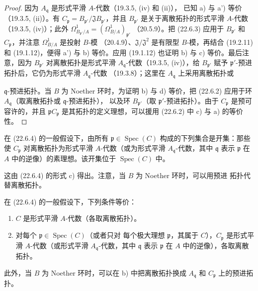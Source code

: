 \begin{proof}
因为 $A_{\mathfrak q}$ 是形式平滑 $A$-代数（19.3.5, (iv) 和 (ii)），
已知 a) 与 a') 等价（19.3.5, (ii)）。有
$C_{\mathfrak p}=B_{\mathfrak p'}/\mathfrak J B_{\mathfrak p'}$，并且
$B_{\mathfrak p'}$ 是关于离散拓扑的形式平滑 $A$-代数
（19.3.5, (iv)）；此外
$\Omega^1_{B_{\mathfrak p'}/A}=(\Omega^1_{B/A})_{\mathfrak p'}$
（20.5.9）。把 (22.6.3) 应用于 $B_{\mathfrak p'}$ 和
$C_{\mathfrak p}$，并注意 $\Omega^1_{B/A}$ 是投射 $B$-模
（20.4.9）、$\mathfrak J/\mathfrak J^2$ 是有限型 $B$-模，再结合
(19.2.11) 和 (19.1.12)，便得 a') 与 b) 等价。应用 (19.1.12) 也证明
b) 与 c) 等价。最后注意，因为 $B_{\mathfrak p'}$ 对离散拓扑是形式平滑
$A_{\mathfrak q}$-代数（19.3.5, (iv)），给 $B_{\mathfrak p'}$ 赋予
$\mathfrak p'$-预进拓扑后，它仍为形式平滑 $A_{\mathfrak q}$-代数
（19.3.8）；这里在 $A_{\mathfrak q}$ 上采用离散拓扑或


$\mathfrak q$-预进拓扑。当 $B$ 为 Noether 环时，为证明 b) 与 d) 等价，把 (22.6.2)
应用于环 $A_{\mathfrak q}$（取离散拓扑或 $\mathfrak q$-预进拓扑），
以及环 $B_{\mathfrak p'}$（取 $\mathfrak p'$-预进拓扑）。由于
$C_{\mathfrak p}$ 是预可容许的，并且
$\mathfrak pC_{\mathfrak p}$ 是其拓扑的定义理想，可以援用 (22.6.2) 中
c) 与 a) 的等价性。
\end{proof}

\begin{corollary}[22.6.5]
\label{0.22.6.5-fr}
在 (22.6.4) 的一般假设下，由所有
$\mathfrak p\in\operatorname{Spec}(C)$ 构成的下列集合是开集：那些使
$C_{\mathfrak p}$ 对离散拓扑为形式平滑 $A$-代数（或为形式平滑
$A_{\mathfrak q}$-代数，其中 $\mathfrak q$ 表示 $\mathfrak p$ 在
$A$ 中的逆像）的素理想。该开集位于 $\operatorname{Spec}(C)$ 中。
\end{corollary}

这由 (22.6.4) 的形式 c) 得出。注意，当 $B$ 为 Noether 环时，可以用预进
拓扑代替离散拓扑。

\begin{corollary}[22.6.6]
\label{0.22.6.6-fr}
在 (22.6.4) 的一般假设下，下列条件等价：
\begin{enumerate}
  \item[a)] $C$ 是形式平滑 $A$-代数（各取离散拓扑）。
  \item[b)] 对每个 $\mathfrak p\in\operatorname{Spec}(C)$（或者只对
  每个极大理想 $\mathfrak p$，其属于 $C$），$C_{\mathfrak p}$ 是形式平滑
  $A$-代数（或形式平滑 $A_{\mathfrak q}$-代数，其中 $\mathfrak q$ 表示
  $\mathfrak p$ 在 $A$ 中的逆像），各取离散拓扑。
\end{enumerate}
此外，当 $B$ 为 Noether 环时，可以在 b) 中把离散拓扑换成
$A_{\mathfrak q}$ 和 $C_{\mathfrak p}$ 上的预进拓扑。
\end{corollary}

